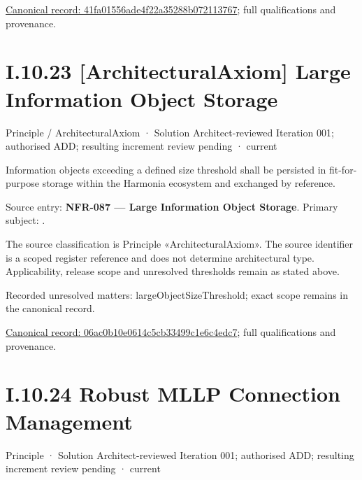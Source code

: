{\footnotesize \href{../../../../../../../continuum/motivation/principle/architectural-axiom/41fa01556ade4f22a35288b072113767.md}{Canonical record: 41fa01556ade4f22a35288b072113767}; full qualifications and provenance.}\par
\section*{I.10.23 [ArchitecturalAxiom] Large Information Object Storage}
\label{navigation:I.10.23}

\label{element:06ac0b10e0614c5cb33499c1e6c4edc7}
{\small Principle / ArchitecturalAxiom · Solution Architect-reviewed Iteration 001; authorised ADD; resulting increment review pending · current}\par

Information objects exceeding a defined size threshold shall be persisted in fit-for-purpose storage within the Harmonia ecosystem and exchanged by reference.



Source entry: \textbf{NFR-087 — Large Information Object Storage}. Primary subject: \texttt{}.



The source classification is Principle «ArchitecturalAxiom». The source identifier is a scoped register reference and does not determine architectural type. Applicability, release scope and unresolved thresholds remain as stated above.


{\small Recorded unresolved matters: largeObjectSizeThreshold; exact scope remains in the canonical record.}\par
{\footnotesize \href{../../../../../../../continuum/motivation/principle/architectural-axiom/06ac0b10e0614c5cb33499c1e6c4edc7.md}{Canonical record: 06ac0b10e0614c5cb33499c1e6c4edc7}; full qualifications and provenance.}\par
\section*{I.10.24 Robust MLLP Connection Management}
\label{navigation:I.10.24}

\label{element:e7b7d94a94194ef28a12051a550d3f3f}
{\small Principle · Solution Architect-reviewed Iteration 001; authorised ADD; resulting increment review pending · current}\par

